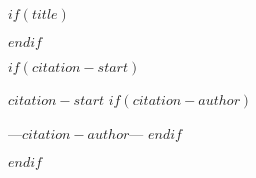$if(title)$
\maketitle
$endif$

$if(citation-start)$
\newpage{}
\thispagestyle {empty}
    
    \vspace*{2cm}
    
    \begin{center}
        \Large{\parbox{12cm}{
            \begin{raggedright}
            {\Large 
                \textit{$citation-start$}
            }
$if(citation-author)$
\par
            \vspace{.5cm}\hfill{---$citation-author$---}
$endif$
            \end{raggedright}
        }
    }
    \end{center}
    
    \newpage
$endif$